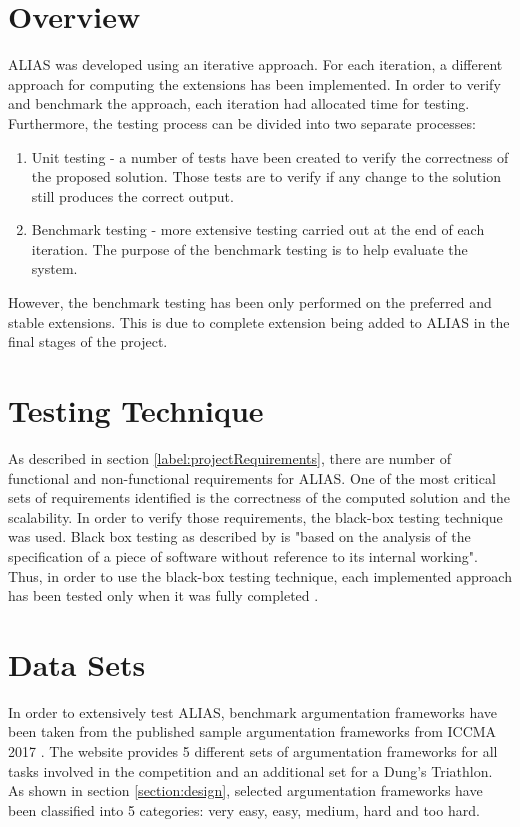 \section{Overview}
ALIAS was developed using an iterative approach. For each iteration, a different approach for computing the extensions has been implemented. In order to verify and benchmark the approach, each iteration had allocated time for testing. Furthermore, the testing process can be divided into two separate processes: 
\begin{enumerate}
	\item Unit testing - a number of tests have been created to verify the correctness of the proposed solution. Those tests are to verify if any change to the solution still produces the correct output. 
	\item Benchmark testing - more extensive testing carried out at the end of each iteration. The purpose of the benchmark testing is to help evaluate the system. 
\end{enumerate}
However, the benchmark testing has been only performed on the preferred and stable extensions. This is due to complete extension being added to ALIAS in the final stages of the project.

\section{Testing Technique}
As described in section \ref{label:projectRequirements}, there are number of functional and non-functional requirements for ALIAS. One of the most critical sets of requirements identified is the correctness of the computed solution and the scalability. In order to verify those requirements, the black-box testing technique was used. Black box testing as described by \citet{testing2} is "based on the analysis of the specification of a piece of software without reference to its internal working". Thus, in order to use the black-box testing technique, each implemented approach has been tested only when it was fully completed \citep{blackbox}.

\section{Data Sets}
In order to extensively test ALIAS, benchmark argumentation frameworks have been taken from the published sample argumentation frameworks from ICCMA 2017 \citep{iccmaResults}. The website provides 5 different sets of argumentation frameworks for all tasks involved in the competition and an additional set for a Dung's Triathlon. As shown in section \ref{section:design}, selected argumentation frameworks have been classified into 5 categories: very easy, easy, medium, hard and too hard. 

